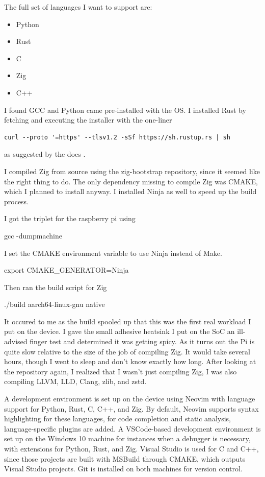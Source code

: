 \documentclass[12pt]{article}
\begin{document}
The full set of languages I want to support are:
\begin{itemize}
  \item Python
  \item Rust
  \item C
  \item Zig
  \item C++
\end{itemize}

I found GCC and Python came pre-installed with the OS. 
I installed Rust by fetching and executing the installer with the one-liner 
\begin{lstlisting}
curl --proto '=https' --tlsv1.2 -sSf https://sh.rustup.rs | sh
\end{lstlisting}
as suggested by the docs \cite{rust_installation}.

I compiled Zig from source using the zig-bootstrap \cite{zig-bootstrap} repository, since it seemed like the right thing to do. The only dependency missing to compile Zig was CMAKE, which I planned to install anyway. I installed Ninja as well to speed up the build process.

I got the triplet for the raspberry pi using

gcc -dumpmachine

I set the CMAKE environment variable to use Ninja instead of Make.

export CMAKE_GENERATOR=Ninja

Then ran the build script for Zig

./build aarch64-linux-gnu native

It occured to me as the build spooled up that this was the first real workload I put on the device. I gave the small adhesive heatsink I put on the SoC an ill-advised finger test and determined it was getting spicy. As it turns out the Pi is quite slow relative to the size of the job of compiling Zig. It would take several hours, though I went to sleep and don't know exactly how long. After looking at the repository again, I realized that I wasn't just compiling Zig, I was also compiling LLVM, LLD, Clang, zlib, and zstd. 

A development environment is set up on the device using Neovim with language support for Python, Rust, C, C++, and Zig. By default, Neovim supports syntax highlighting for these languages, for code completion and static analysis, language-specific plugins are added. A VSCode-based development environment is set up on the Windows 10 machine for instances when a debugger is necessary, with extensions for Python, Rust, and Zig. Visual Studio is used for C and C++, since those projects are built with MSBuild through CMAKE, which outputs Visual Studio projects. Git is installed on both machines for version control.
\end{document}
